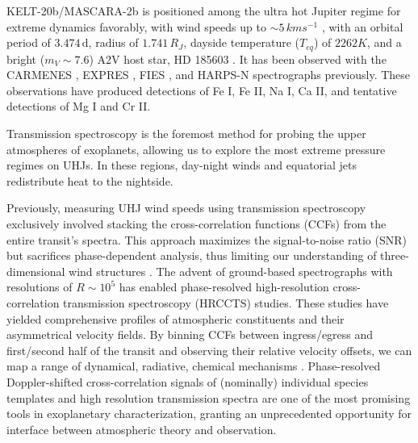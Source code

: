 \documentclass[twocolumn]{aastex631}
\begin{document}
        KELT-20b/MASCARA-2b is positioned among the ultra hot Jupiter regime for extreme dynamics favorably, with wind speeds up to $\sim5\,kms^{-1}$ \citep{Tan2019}, with an orbital period of $3.474\,\text{d}$, radius of $1.741\,R_{J}$, dayside temperature ($T_{eq}$) of $2262K$, and a bright ($m_V\sim7.6$) A2V host star, HD 185603 \citep{Lund2017}. It has been observed with the CARMENES \citep{CasasayasBarris2019, Nugroho2020, Kesseli2020}, EXPRES \citep{Hoeijmakers2020}, FIES \citep{BelloArufe2022}, and HARPS-N \citep{CasasayasBarris2019, Rainer2021, Langeveld2022, Sicilia2022} spectrographs previously. These observations have produced detections of Fe I, Fe II, Na I, Ca II, and tentative detections of Mg I and Cr II.

        Transmission spectroscopy is the foremost method for probing the upper atmospheres of exoplanets, allowing us to explore the most extreme pressure regimes on UHJs. In these regions, day-night winds and equatorial jets redistribute heat to the nightside.
        
        
        
        
        Previously, measuring UHJ wind speeds using transmission spectroscopy exclusively involved stacking the cross-correlation functions (CCFs) from the entire transit's spectra. This approach maximizes the signal-to-noise ratio (SNR) but sacrifices phase-dependent analysis, thus limiting our understanding of three-dimensional wind structures \citep{MillerRicciKempton2012}. The advent of ground-based spectrographs with resolutions of $R\sim10^{5}$  has enabled phase-resolved high-resolution cross-correlation transmission spectroscopy (HRCCTS) studies. These studies have yielded comprehensive profiles of atmospheric constituents and their asymmetrical velocity fields. By binning CCFs between ingress/egress and first/second half of the transit and observing their relative velocity offsets, we can map a range of dynamical, radiative, chemical mechanisms \citet{Savel2023}. Phase-resolved Doppler-shifted cross-correlation signals of (nominally) individual species templates and high resolution transmission spectra are one of the most promising tools in exoplanetary characterization, granting an unprecedented opportunity for interface between atmospheric theory and observation.

        
            
\end{document}
